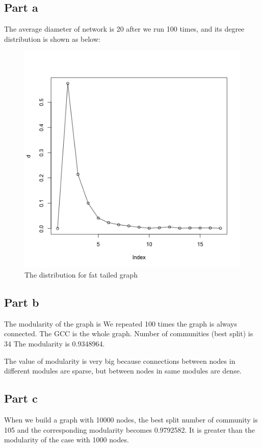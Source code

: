\documentclass{article}
\begin{document}
\subsection{Part a}
The average diameter of network is 20 after we run 100 times, and its degree distribution is shown as below:
\begin{figure}[htbp]
\centering
\includegraphics[width=.6\textwidth]{figure2a.png}
\caption{The distribution for fat tailed graph}
\label{fig:sp_hist}
\end{figure}

\subsection{Part b}
The modularity of the graph is 
We repeated 100 times the graph is always connected.
The GCC is the whole graph.
Number of communities (best split) is 34
The modularity is 0.9348964.

The value of modularity is very big because connections between nodes in different modules are sparse, but between nodes in same modules are dense. 
\subsection{Part c}
When we build a graph with 10000 nodes, the best split number of community is 105 and the corresponding modularity becomes 0.9792582.
It is greater than the modularity of the case with 1000 nodes.
\end{document}
